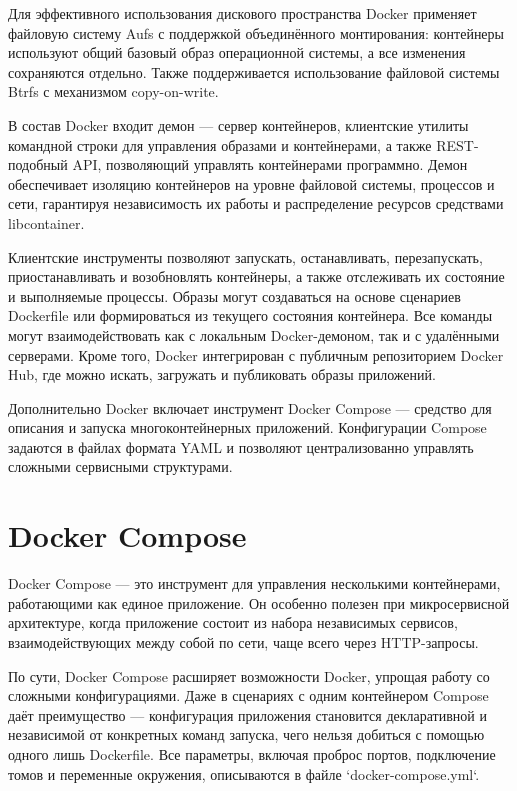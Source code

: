 \documentclass[14pt,a4paper]{extarticle}
\begin{document}
Для эффективного использования дискового пространства Docker применяет файловую
систему Aufs с поддержкой объединённого монтирования: контейнеры используют
общий базовый образ операционной системы, а все изменения сохраняются отдельно.
Также поддерживается использование файловой системы Btrfs с механизмом
copy-on-write.

В состав Docker входит демон — сервер контейнеров, клиентские утилиты командной
строки для управления образами и контейнерами, а также REST-подобный API,
позволяющий управлять контейнерами программно. Демон обеспечивает изоляцию
контейнеров на уровне файловой системы, процессов и сети, гарантируя
независимость их работы и распределение ресурсов средствами libcontainer.

Клиентские инструменты позволяют запускать, останавливать, перезапускать,
приостанавливать и возобновлять контейнеры, а также отслеживать их состояние и
выполняемые процессы. Образы могут создаваться на основе сценариев Dockerfile
или формироваться из текущего состояния контейнера. Все команды могут
взаимодействовать как с локальным Docker-демоном, так и с удалёнными серверами.
Кроме того, Docker интегрирован с публичным репозиторием Docker Hub, где можно
искать, загружать и публиковать образы приложений.

Дополнительно Docker включает инструмент Docker Compose — средство для описания
и запуска многоконтейнерных приложений. Конфигурации Compose задаются в файлах
формата YAML и позволяют централизованно управлять сложными сервисными
структурами.

\newpage
\section{Docker Compose}
Docker Compose — это инструмент для управления несколькими контейнерами,
работающими как единое приложение. Он особенно полезен при микросервисной
архитектуре, когда приложение состоит из набора независимых сервисов,
взаимодействующих между собой по сети, чаще всего через HTTP-запросы.

По сути, Docker Compose расширяет возможности Docker, упрощая работу со
сложными конфигурациями. Даже в сценариях с одним контейнером Compose даёт
преимущество — конфигурация приложения становится декларативной и независимой
от конкретных команд запуска, чего нельзя добиться с помощью одного лишь
Dockerfile. Все параметры, включая проброс портов, подключение томов и
переменные окружения, описываются в файле `docker-compose.yml`.
\end{document}
